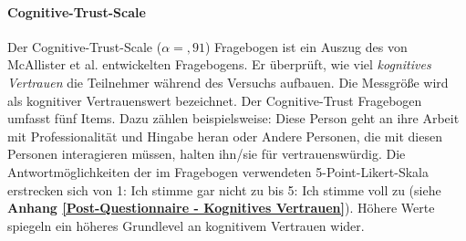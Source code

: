 \documentclass[a4paper,11pt]{article}%
\renewcommand{\\}{\vspace*{0.5\baselineskip} \newline}
\begin{document}
%			

		\paragraph{Cognitive-Trust-Scale}
Der Cognitive-Trust-Scale ($\alpha =,91$) Fragebogen ist ein Auszug des von McAllister et al. \citep[S. 37]{mcallister1995affect} entwickelten Fragebogens. Er überprüft, wie viel \textit{kognitives Vertrauen} die Teilnehmer während des Versuchs aufbauen. Die Messgröße wird als kognitiver Vertrauenswert bezeichnet. Der Cognitive-Trust Fragebogen umfasst fünf Items. Dazu zählen beispielsweise: \glqq{}Diese Person geht an ihre Arbeit mit Professionalität und Hingabe heran\dq{} oder \glqq{}Andere Personen, die mit diesen Personen interagieren müssen, halten ihn/sie für vertrauenswürdig\dq{}. Die Antwortmöglichkeiten der im Fragebogen verwendeten 5-Point-Likert-Skala erstrecken sich von 1: \glqq{}Ich stimme gar nicht zu \dq{} bis 5: \glqq{}Ich stimme voll zu\dq{} (siehe \textbf{Anhang \ref{Post-Questionnaire - Kognitives Vertrauen}}). Höhere Werte spiegeln ein höheres Grundlevel an kognitivem Vertrauen wider.

\end{document}
